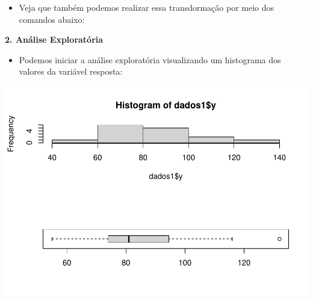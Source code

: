 \documentclass[
]{book}
\newenvironment{Shaded}{\begin{snugshade}}{\end{snugshade}}
\newcommand{\AttributeTok}[1]{\textcolor[rgb]{0.13,0.29,0.53}{#1}}
\newcommand{\ConstantTok}[1]{\textcolor[rgb]{0.56,0.35,0.01}{#1}}
\newcommand{\DecValTok}[1]{\textcolor[rgb]{0.00,0.00,0.81}{#1}}
\newcommand{\FunctionTok}[1]{\textcolor[rgb]{0.13,0.29,0.53}{\textbf{#1}}}
\newcommand{\NormalTok}[1]{#1}
\newcommand{\OtherTok}[1]{\textcolor[rgb]{0.56,0.35,0.01}{#1}}
\newcommand{\SpecialCharTok}[1]{\textcolor[rgb]{0.81,0.36,0.00}{\textbf{#1}}}
\providecommand{\tightlist}{%
  \setlength{\itemsep}{0pt}\setlength{\parskip}{0pt}}
\begin{document}
\begin{itemize}
\tightlist
\item
  Veja que também podemos realizar essa transdormação por meio dos comandos abaixo:
\end{itemize}

\begin{Shaded}
\end{Shaded}

\textbf{2. Análise Exploratória}

\begin{itemize}
\tightlist
\item
  Podemos iniciar a análise exploratória visualizando um histograma dos valores da variável resposta:
\end{itemize}

\begin{Shaded}
\end{Shaded}

\includegraphics{_main_files/figure-latex/hist2-1.pdf}
\end{document}
